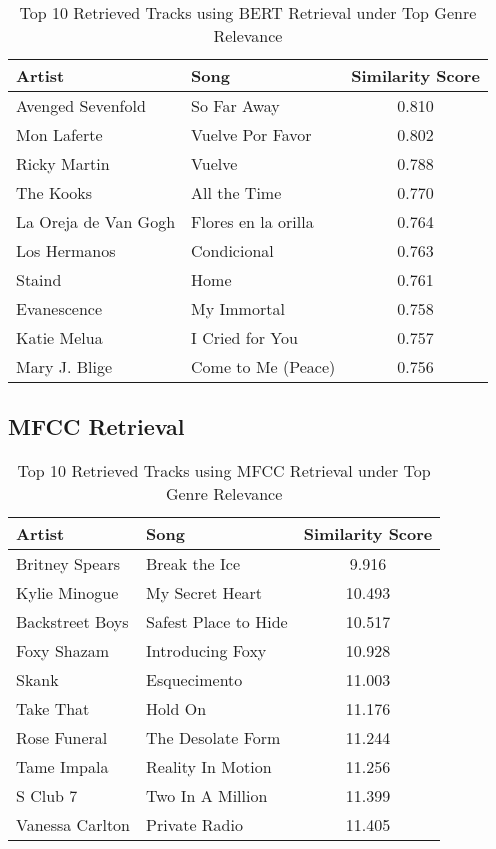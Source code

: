 \documentclass[sigconf]{acmart}
\begin{document}
\begin{table}[H]
    \centering
    \caption{Top 10 Retrieved Tracks using BERT Retrieval under Top Genre Relevance}
    \label{tab:retrieved_bert_top_genre_specific}
    \footnotesize
    \begin{tabular}{l l c}
        \toprule
        \textbf{Artist} & \textbf{Song} & \textbf{Similarity Score} \\
        \midrule
        Avenged Sevenfold & So Far Away & 0.810 \\
        Mon Laferte & Vuelve Por Favor & 0.802 \\
        Ricky Martin & Vuelve & 0.788 \\
        The Kooks & All the Time & 0.770 \\
        La Oreja de Van Gogh & Flores en la orilla & 0.764 \\
        Los Hermanos & Condicional & 0.763 \\
        Staind & Home & 0.761 \\
        Evanescence & My Immortal & 0.758 \\
        Katie Melua & I Cried for You & 0.757 \\
        Mary J. Blige & Come to Me (Peace) & 0.756 \\
        \bottomrule
    \end{tabular}
\end{table}

\subsection{MFCC Retrieval}


\begin{table}[H]
    \centering
    \caption{Top 10 Retrieved Tracks using MFCC Retrieval under Top Genre Relevance}
    \label{tab:retrieved_mfcc_top_genre_specific}
    \footnotesize
    \begin{tabular}{l l c}
        \toprule
        \textbf{Artist} & \textbf{Song} & \textbf{Similarity Score} \\
        \midrule
        Britney Spears & Break the Ice & 9.916 \\
        Kylie Minogue & My Secret Heart & 10.493 \\
        Backstreet Boys & Safest Place to Hide & 10.517 \\
        Foxy Shazam & Introducing Foxy & 10.928 \\
        Skank & Esquecimento & 11.003 \\
        Take That & Hold On & 11.176 \\
        Rose Funeral & The Desolate Form & 11.244 \\
        Tame Impala & Reality In Motion & 11.256 \\
        S Club 7 & Two In A Million & 11.399 \\
        Vanessa Carlton & Private Radio & 11.405 \\
        \bottomrule
    \end{tabular}
\end{table}
\end{document}
